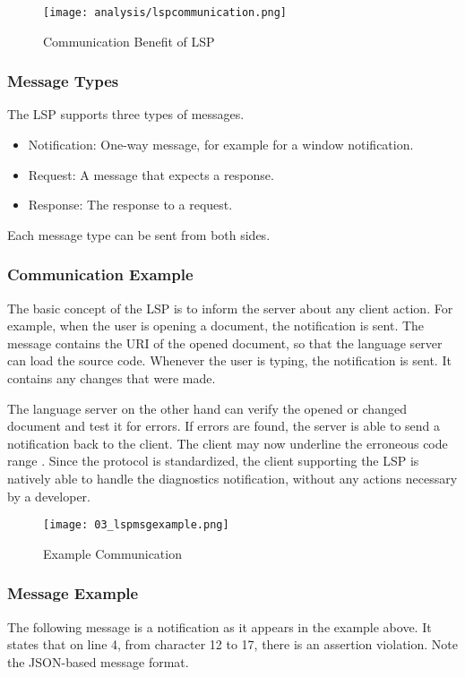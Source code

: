 \begin{figure}[h]
    \centering
    \texttt{[image: analysis/lspcommunication.png]}
    \caption{Communication Benefit of LSP}
    \label{fig:lspcommunication}
\end{figure}

\subsubsection{Message Types}
The LSP supports three types of messages.
\begin{itemize}
    \item Notification: One-way message, for example for a window notification.
    \item Request: A message that expects a response.
    \item Response: The response to a request.
\end{itemize}
Each message type can be sent from both sides.

\subsubsection{Communication Example}
The basic concept of the LSP is to inform the server about any client action.
For example, when the user is opening a document, the notification  is sent.
The message contains the URI of the opened document, so that the language server can load the source code.
Whenever the user is typing, the notification  is sent.
It contains any changes that were made.

The language server on the other hand can verify the opened or changed document and test it for errors.
If errors are found, the server is able to send a  notification back to the client.
The client may now underline the erroneous code range \cite{lspspec}.
Since the protocol is standardized, the client supporting the LSP is natively able to handle the diagnostics notification, without any actions necessary by a developer.

\begin{figure}[h]
    \centering
    \texttt{[image: 03\_lspmsgexample.png]}
    \caption{Example Communication}
    \label{fig:lspmsgexample}
\end{figure}

\subsubsection{Message Example}
The following message is a  notification as it appears in the example above.
It states that on line 4, from character 12 to 17, there is an assertion violation.
Note the JSON-based message format.\\


